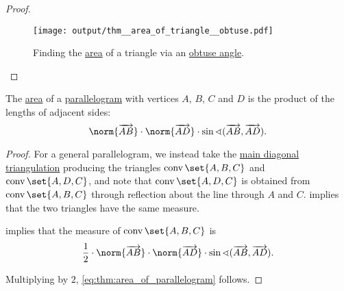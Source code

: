 \begin{proof}
  \begin{figure}[!ht]
    \centering
    \texttt{[image: output/thm\_\_area\_of\_triangle\_\_obtuse.pdf]}
    \caption{Finding the \hyperref[def:figure_area]{area} of a triangle via an \hyperref[def:angle/measure/obtuse]{obtuse angle}.}\label{fig:thm:area_of_triangle/measure/obtuse}
  \end{figure}
\end{proof}

\begin{proposition}\label{thm:area_of_parallelogram}
  The \hyperref[def:figure_area]{area} of a \hyperref[def:parallelogram]{parallelogram} with vertices \( A \), \( B \), \( C \) and \( D \) is the product of the lengths of adjacent sides:
  \begin{equation}\label{eq:thm:area_of_parallelogram}
    \norm{\vect{AB}} \cdot \norm{\vect{AD}} \cdot \sin\sphericalangle(\vect{AB}, \vect{AD}).
  \end{equation}
\end{proposition}
\begin{proof}
  For a general parallelogram, we instead take the \hyperref[thm:diagonal_trapezoid_triangulation]{main diagonal triangulation} producing the triangles \( \conv\set{ A, B, C } \) and \( \conv\set{ A, D, C } \), and note that \( \conv\set{ A, D, C } \) is obtained from \( \conv\set{ A, B, C } \) through reflection about the line through \( A \) and \( C \).  implies that the two triangles have the same measure.

   implies that the measure of \( \conv\set{ A, B, C } \) is
  \begin{equation*}
    \frac 1 2 \cdot \norm{\vect{AB}} \cdot \norm{\vect{AD}} \cdot \sin\sphericalangle(\vect{AB}, \vect{AD}).
  \end{equation*}

  Multiplying by \( 2 \), \eqref{eq:thm:area_of_parallelogram} follows.
\end{proof}

